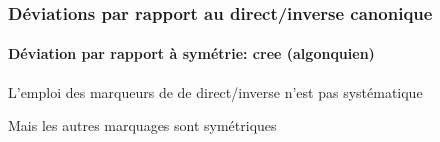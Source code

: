 \begin{frame}
\frametitle{Déviations par rapport au direct/inverse canonique}
\framesubtitle{Déviation par rapport à symétrie: cree (algonquien)}
\begin{smallwideitemize}
\item L'emploi des marqueurs de de direct/inverse n'est pas systématique
\item Mais les autres marquages sont symétriques
\end{smallwideitemize}
\begin{table}[h]
\caption{Plains Cree present paradigms. TA  ``see" and IA ``run" (\cite{wolfart73})}\label{tab:cree.tr} \centering
{}
\end{table}
\end{frame}
